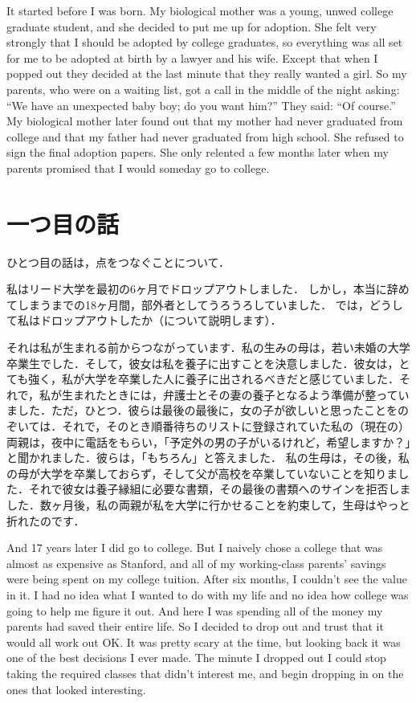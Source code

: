 \documentclass[twocolumn]{jsarticle}
\begin{document}
It started before I was born. My biological mother was a young, unwed college graduate student, and she decided to put me up for adoption. She felt very strongly that I should be adopted by college graduates, so everything was all set for me to be adopted at birth by a lawyer and his wife. Except that when I popped out they decided at the last minute that they really wanted a girl. So my parents, who were on a waiting list, got a call in the middle of the night asking: ``We have an unexpected baby boy; do you want him?'' They said: ``Of course.''
My biological mother later found out that my mother had never graduated from college and that my father had never graduated from high school. She refused to sign the final adoption papers. She only relented a few months later when my parents promised that I would someday go to college.

\newpage

\section*{一つ目の話}

ひとつ目の話は，点をつなぐことについて．

私はリード大学を最初の6ヶ月でドロップアウトしました．
しかし，本当に辞めてしまうまでの18ヶ月間，部外者としてうろうろしていました．
では，どうして私はドロップアウトしたか（について説明します）．

それは私が生まれる前からつながっています．私の生みの母は，若い未婚の大学卒業生でした．そして，彼女は私を養子に出すことを決意しました．彼女は，とても強く，私が大学を卒業した人に養子に出されるべきだと感じていました．それで，私が生まれたときには，弁護士とその妻の養子となるよう準備が整っていました．ただ，ひとつ．彼らは最後の最後に，女の子が欲しいと思ったことをのぞいては．それで，そのとき順番待ちのリストに登録されていた私の（現在の）両親は，夜中に電話をもらい，「予定外の男の子がいるけれど，希望しますか？」と聞かれました．彼らは，「もちろん」と答えました．
私の生母は，その後，私の母が大学を卒業しておらず，そして父が高校を卒業していないことを知りました．それで彼女は養子縁組に必要な書類，その最後の書類へのサインを拒否しました．数ヶ月後，私の両親が私を大学に行かせることを約束して，生母はやっと折れたのです．

\newpage

And 17 years later I did go to college. But I naively chose a college that was almost as expensive as Stanford, and all of my working-class parents' savings were being spent on my college tuition. After six months, I couldn't see the value in it. I had no idea what I wanted to do with my life and no idea how college was going to help me figure it out. And here I was spending all of the money my parents had saved their entire life. So I decided to drop out and trust that it would all work out OK. It was pretty scary at the time, but looking back it was one of the best decisions I ever made. The minute I dropped out I could stop taking the required classes that didn't interest me, and begin dropping in on the ones that looked interesting.
\end{document}
